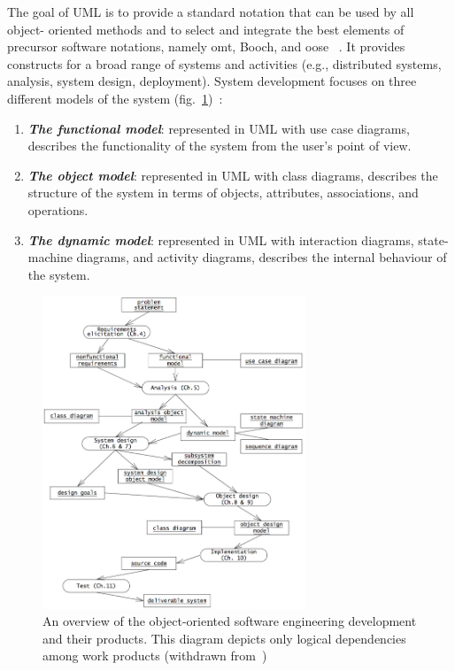 The goal of UML is to provide a standard notation that can be used by all
object- oriented methods and to select and integrate the best elements of
precursor software notations, namely \gls{omt}, Booch, and \gls{oose}
~\cite{bruegge2004object}. It provides
constructs for a broad range of systems and activities (e.g., distributed
systems, analysis, system design, deployment). System development focuses on
three different models of the system
(fig.~\ref{fig:sw-devel-activities})~\cite{bruegge2004object}:
\begin{enumerate}
  \item \textbf{\emph{The functional model}}: represented in UML with use case
    diagrams, describes the functionality of the system from the user's point of
    view.
  \item \textbf{\emph{The object model}}: represented in UML with class
    diagrams, describes the structure of the system in terms of objects,
    attributes, associations, and operations.  
  \item \textbf{\emph{The dynamic model}}: represented in UML with interaction
    diagrams, state-machine diagrams, and activity diagrams, describes the
    internal behaviour of the system.
\end{enumerate}

\begin{figure}[!hbt]
\centering
    \includegraphics[width=0.7\textwidth]{./img/sw-devel-activities.png}
  \caption{An overview of the object-oriented software engineering development
  and their products. This diagram depicts only logical dependencies among work
  products (withdrawn from~\cite{bruegge2004object})}
\label{fig:sw-devel-activities}
\end{figure}
